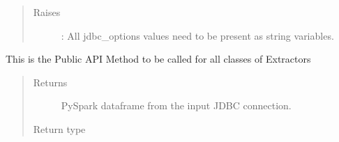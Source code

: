\documentclass[a4paper,10pt, twoside,english]{sphinxmanual}
\begin{document}
\begin{fulllineitems}
\begin{quote}
\begin{description}
\begin{itemize}
\end{itemize}

\item[{Raises}] \leavevmode
{}: \textendash{} All jdbc\_options values need to be present as string variables.

\end{description}\end{quote}

\begin{fulllineitems}
\label{\detokenize{extractor/jdbc:spooq2.extractor.jdbc.JDBCExtractorFullLoad.extract}}
This is the Public API Method to be called for all classes of Extractors
\begin{quote}\begin{description}
\item[{Returns}] \leavevmode
PySpark dataframe from the input JDBC connection.

\item[{Return type}] \leavevmode
{}

\end{description}\end{quote}

\end{fulllineitems}


\end{fulllineitems}

\end{document}
